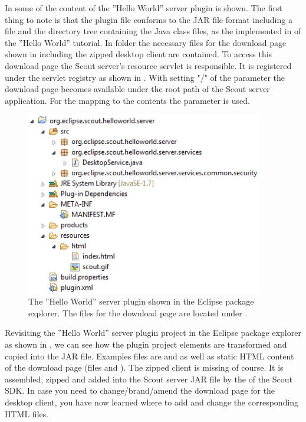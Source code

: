 \documentclass[a4paper,10pt,twoside]{book}
\begin{document}
In  some of the content of the ''Hello World'' server plugin is shown.
The first thing to note is that the plugin file conforms to the JAR file format including a  file and the directory tree containing the Java class files, as the  implemented in  of the ''Hello World'' tutorial.
In folder  the necessary files for the download page shown in  including the zipped desktop client are contained.
To access this download page the Scout server's resource servlet  is responsible.
It is registered under the servlet registry as shown in .
With setting "/" of the  parameter the download page becomes available under the root path of the Scout server application.
For the mapping to the contents  the parameter  is used.

\begin{figure}
\includegraphics[height=8cm]{helloworld_server_plugin.png} 
\caption{The ''Hello World'' server plugin shown in the Eclipse package explorer.
The files for the download page are located under .} 
\end{figure}

Revisiting the ''Hello World'' server plugin project in the Eclipse package explorer as shown in , we can see how the plugin project elements are transformed and copied into the JAR file.
Examples files are  and  as well as static HTML content of the download page (files  and ).
The zipped client is missing of course.
It is assembled, zipped and added into the Scout server JAR file by the  of the Scout SDK.
In case you need to change/brand/amend the download page for the desktop client, you have now learned where to add and change the corresponding HTML files.
\end{document}
